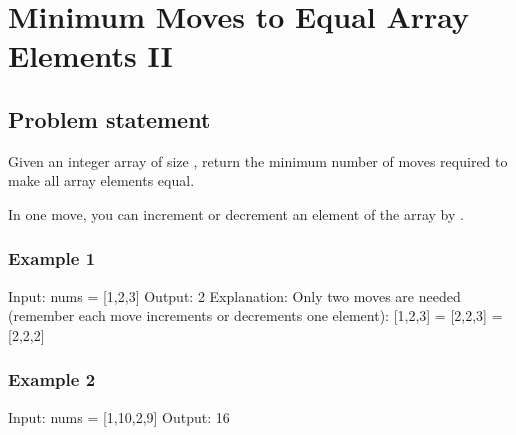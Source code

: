 \documentclass[letterpaper,12pt,english]{book}
\begin{document}
\sphinxstepscope


\section{Minimum Moves to Equal Array Elements II}
\label{\detokenize{Mathematics/09_MTH_462_Minimum_Moves_to_Equal_Array_Elements_II:minimum-moves-to-equal-array-elements-ii}}\label{\detokenize{Mathematics/09_MTH_462_Minimum_Moves_to_Equal_Array_Elements_II::doc}}

\subsection{Problem statement\sphinxfootnotemark[129]}
\label{\detokenize{Mathematics/09_MTH_462_Minimum_Moves_to_Equal_Array_Elements_II:problem-statement}}%
\begin{footnotetext}[129]\sphinxAtStartFootnote
{}
%
\end{footnotetext}\ignorespaces 
\sphinxAtStartPar
Given an integer array  of size , return the minimum number of moves required to make all array elements equal.

\sphinxAtStartPar
In one move, you can increment or decrement an element of the array by .


\subsubsection{Example 1}
\label{\detokenize{Mathematics/09_MTH_462_Minimum_Moves_to_Equal_Array_Elements_II:example-1}}
\begin{sphinxVerbatim}[commandchars=\\\{\}]
Input: nums = [1,2,3]
Output: 2
Explanation:
Only two moves are needed (remember each move increments or decrements one element):
[1,2,3]  =\PYGZgt{}  [2,2,3]  =\PYGZgt{}  [2,2,2]
\end{sphinxVerbatim}


\subsubsection{Example 2}
\label{\detokenize{Mathematics/09_MTH_462_Minimum_Moves_to_Equal_Array_Elements_II:example-2}}
\begin{sphinxVerbatim}[commandchars=\\\{\}]
Input: nums = [1,10,2,9]
Output: 16
\end{sphinxVerbatim}
\end{document}
